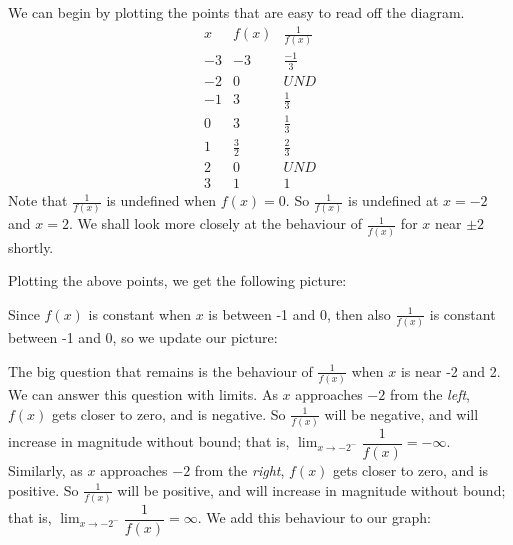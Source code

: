 \begin{solution}
We can begin by plotting the points that are easy to read off the diagram.
\[
\begin{array}{c|c|c}
x&f(x)&\frac{1}{f(x)}\\
\hline
-3&-3&\frac{-1}{3}\\
-2&0&UND\\
-1&3&\frac{1}{3}\\
0&3&\frac{1}{3}\\
1&\frac{3}{2}&\frac{2}{3}\\
2&0&UND\\
3&1&1
\end{array}
\]
Note that $\frac{1}{f(x)}$ is undefined when $f(x) = 0$.
        So $\frac{1}{f(x)}$ is undefined at $x=-2$ and $x=2$.
        We shall look more closely at the behaviour of $\frac{1}{f(x)}$
        for $x$ near $\pm 2$ shortly.

        Plotting the above points, we get the following picture:
\begin{center}
\end{center}

Since $f(x)$ is constant when $x$ is between -1 and 0, then also $\frac{1}{f(x)}$ is constant between -1 and 0, so we update our picture:

\begin{center}
\end{center}

The big question that remains is the behaviour of $\frac{1}{f(x)}$ when $x$ is near -2 and 2. We can answer this question with limits. As $x$ approaches $-2$ from the \emph{left}, $f(x)$ gets closer to zero, and is negative. So $\frac{1}{f(x)}$ will be negative, and will increase in magnitude without bound; that is, $\displaystyle\lim_{x \rightarrow -2^-}\dfrac{1}{f(x)}=-\infty$. Similarly, as
$x$ approaches $-2$ from the \emph{right}, $f(x)$ gets closer to zero, and is positive. So $\frac{1}{f(x)}$ will be positive, and will increase in magnitude without bound; that is, $\displaystyle\lim_{x \rightarrow -2^-}\dfrac{1}{f(x)}=\infty$. We add this behaviour to our graph:


\end{solution}
